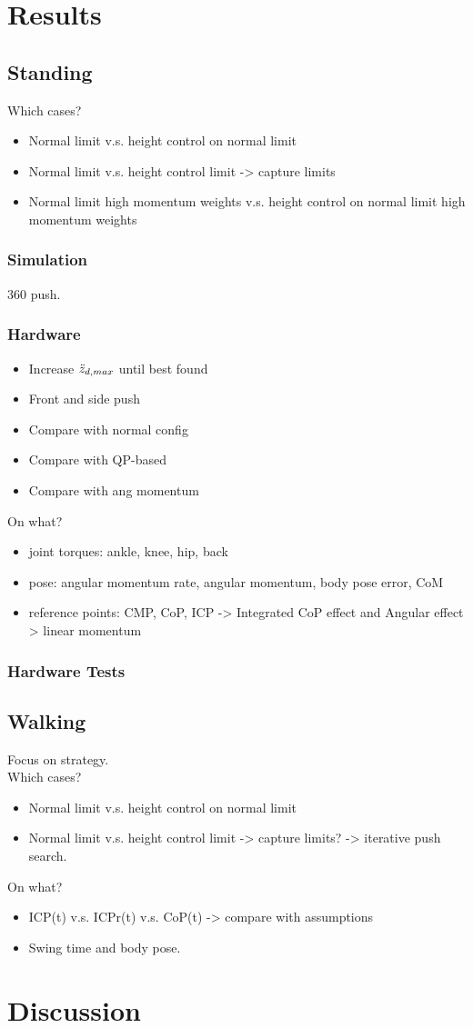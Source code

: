 \clearpage
\section{Results}
\subsection{Standing}
Which cases?
\begin{itemize}
	\item Normal limit v.s. height control on normal limit
	\item Normal limit v.s. height control limit -> capture limits
	\item Normal limit high momentum weights v.s. height control on normal limit high momentum weights
\end{itemize}
\subsubsection{Simulation}
360 push.
\subsubsection{Hardware}
\begin{itemize}
	\item Increase $\ddot{z}_{d,max}$ until best found
	\item Front and side push
	\item Compare with normal config
	\item Compare with QP-based
	\item Compare with ang momentum
\end{itemize}
On what?
\begin{itemize}
	\item joint torques: ankle, knee, hip, back
	\item pose: angular momentum rate, angular momentum, body pose error, CoM
	\item reference points: CMP, CoP, ICP -> Integrated CoP effect and Angular effect > linear momentum
\end{itemize}

\subsubsection{Hardware Tests}
\subsection{Walking}
Focus on strategy.\\
Which cases? 
\begin{itemize}
	\item Normal limit v.s. height control on normal limit
	\item Normal limit v.s. height control limit -> capture limits? -> iterative push search.
\end{itemize}

On what?
\begin{itemize}
	\item ICP(t) v.s. ICPr(t) v.s. CoP(t) -> compare with assumptions
	\item Swing time and body pose.
\end{itemize}


\section{Discussion}
